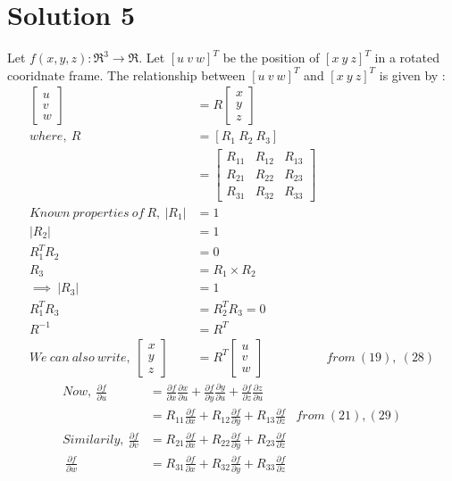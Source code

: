 \documentclass[a4paper,fleqn,11pt]{article}
\theoremstyle{mytheor}
\begin{document}
\section*{Solution 5}

Let $f(x, y, z) : \Re^3 \rightarrow \Re$. Let $[u\ v\ w]^T$ be the position of $[x\ y\ z]^T$ in a rotated cooridnate frame.
The relationship between $[u\ v\ w]^T$ and $[x\ y\ z]^T$ is given by :
\begin{align}
\begin{bmatrix}
	u \\
	v \\
	w
\end{bmatrix} & =
	R
\begin{bmatrix}
	x \\
	y \\
	z
\end{bmatrix} \\
where,\ R & = [R_1\ R_2\ R_3] \\
& = \begin{bmatrix}
		R_{11} & R_{12} & R_{13} \\
		R_{21} & R_{22} & R_{23} \\
		R_{31} & R_{32} & R_{33}
	\end{bmatrix} \\
Known\ properties\ of\ R,\ |R_1| & = 1 \\
|R_2| & = 1 \\
R_1^T R_2 & = 0 \\
R_3  & = R_1 \times R_2 \\
\implies\ |R_3| & = 1 \\
R_1^T R_3 & = R_2^T R_3 = 0 \\
R^{-1} & = R^T \\
We\ can\ also\ write,\
\begin{bmatrix}
	x \\
	y \\
	z
\end{bmatrix} & =
	R^T
\begin{bmatrix}
	u \\
	v \\
	w
\end{bmatrix} & from\ (19),\ (28)
\end{align}
\begin{align}
Now,\ \frac{\partial f}{\partial u} & =
\frac{\partial f}{\partial x}\frac{\partial x}{\partial u} +
\frac{\partial f}{\partial y}\frac{\partial y}{\partial u} +
\frac{\partial f}{\partial z}\frac{\partial z}{\partial u} \\
& = R_{11}\frac{\partial f}{\partial x} +
	R_{12}\frac{\partial f}{\partial y} +
	R_{13}\frac{\partial f}{\partial z} & from\ (21), (29) \\
Similarily,\ \frac{\partial f}{\partial v}
& = R_{21}\frac{\partial f}{\partial x} +
	R_{22}\frac{\partial f}{\partial y} +
	R_{23}\frac{\partial f}{\partial z}\\
\ \frac{\partial f}{\partial w}
& = R_{31}\frac{\partial f}{\partial x} +
	R_{32}\frac{\partial f}{\partial y} +
	R_{33}\frac{\partial f}{\partial z}
\end{align}
\end{document}
